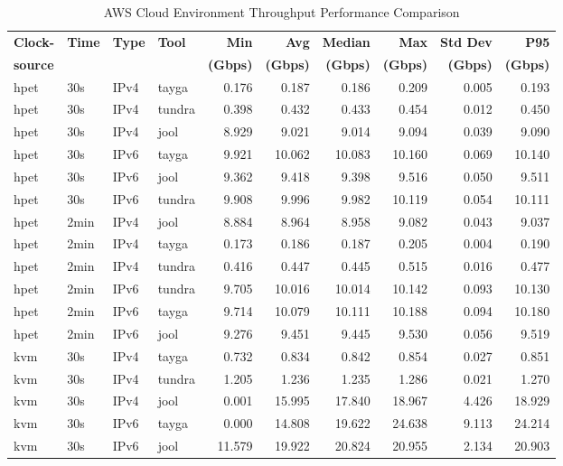 \begin{table}[htbp]
\centering
\caption{AWS Cloud Environment Throughput Performance Comparison}
\label{tab:throughput_comparison_aws}
\footnotesize
\begin{tabular}{|l|l|l|l|r|r|r|r|r|r|}
\hline
\textbf{Clock-} & \textbf{Time} & \textbf{Type} & \textbf{Tool} & \textbf{Min} & \textbf{Avg} & \textbf{Median} & \textbf{Max} & \textbf{Std Dev} & \textbf{P95} \\
\textbf{source} & & & & \textbf{(Gbps)} & \textbf{(Gbps)} & \textbf{(Gbps)} & \textbf{(Gbps)} & \textbf{(Gbps)} & \textbf{(Gbps)} \\
\hline
hpet & 30s & IPv4 & tayga & 0.176 & 0.187 & 0.186 & 0.209 & 0.005 & 0.193 \\
hpet & 30s & IPv4 & tundra & 0.398 & 0.432 & 0.433 & 0.454 & 0.012 & 0.450 \\
hpet & 30s & IPv4 & jool & 8.929 & 9.021 & 9.014 & 9.094 & 0.039 & 9.090 \\
hpet & 30s & IPv6 & tayga & 9.921 & 10.062 & 10.083 & 10.160 & 0.069 & 10.140 \\
hpet & 30s & IPv6 & jool & 9.362 & 9.418 & 9.398 & 9.516 & 0.050 & 9.511 \\
hpet & 30s & IPv6 & tundra & 9.908 & 9.996 & 9.982 & 10.119 & 0.054 & 10.111 \\
hpet & 2min & IPv4 & jool & 8.884 & 8.964 & 8.958 & 9.082 & 0.043 & 9.037 \\
hpet & 2min & IPv4 & tayga & 0.173 & 0.186 & 0.187 & 0.205 & 0.004 & 0.190 \\
hpet & 2min & IPv4 & tundra & 0.416 & 0.447 & 0.445 & 0.515 & 0.016 & 0.477 \\
hpet & 2min & IPv6 & tundra & 9.705 & 10.016 & 10.014 & 10.142 & 0.093 & 10.130 \\
hpet & 2min & IPv6 & tayga & 9.714 & 10.079 & 10.111 & 10.188 & 0.094 & 10.180 \\
hpet & 2min & IPv6 & jool & 9.276 & 9.451 & 9.445 & 9.530 & 0.056 & 9.519 \\
\hline
kvm & 30s & IPv4 & tayga & 0.732 & 0.834 & 0.842 & 0.854 & 0.027 & 0.851 \\
kvm & 30s & IPv4 & tundra & 1.205 & 1.236 & 1.235 & 1.286 & 0.021 & 1.270 \\
kvm & 30s & IPv4 & jool & 0.001 & 15.995 & 17.840 & 18.967 & 4.426 & 18.929 \\
kvm & 30s & IPv6 & tayga & 0.000 & 14.808 & 19.622 & 24.638 & 9.113 & 24.214 \\
kvm & 30s & IPv6 & jool & 11.579 & 19.922 & 20.824 & 20.955 & 2.134 & 20.903 \\

\end{tabular}
\end{table}
